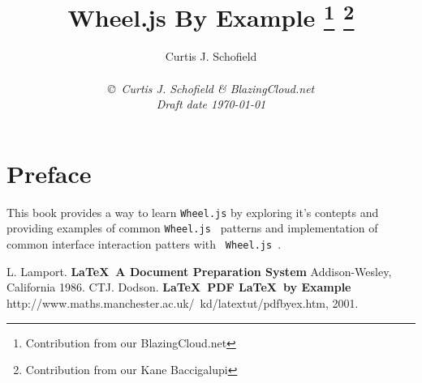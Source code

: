 \documentclass{book}
\title{Wheel.js By Example  
\thanks{Contribution from our BlazingCloud.net}
\thanks{Contribution from our Kane Baccigalupi}}
\author{Curtis J. Schofield \\ \\
  {\small\em \copyright \ Curtis J. Schofield \& BlazingCloud.net } \\ 
  {\small\em Draft date \today }}
\begin{document}
 \maketitle %
\chapter*{Preface}\normalsize
\pagestyle{plain}
This book provides a way to learn {\tt Wheel.js} by exploring it's
contepts and providing examples of common {\tt Wheel.js } patterns
and implementation of common interface interaction patters with {\tt
Wheel.js }.




\pagestyle{headings}







\begin{thebibliography}{99}
 L. Lamport. {\bf \LaTeX \ A Document Preparation System}
Addison-Wesley, California 1986.
 CTJ. Dodson. {\bf \LaTeX \ PDF \LaTeX \ by Example}
http://www.maths.manchester.ac.uk/~kd/latextut/pdfbyex.htm, 2001.
\end{thebibliography}
\end{document}
